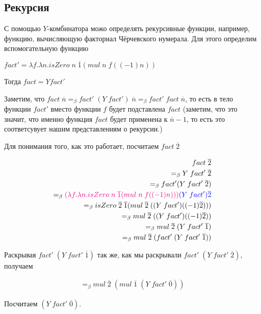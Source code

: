 \subsection{Рекурсия}

С помощью $Y$-комбинатора можо определять рекурсивные функции, например, функцию, вычисляющую факториал Чёрчевского нумерала. Для этого определим вспомогательную функцию

$fact' = \lambda f. \lambda n. isZero\; n \; \overline{1} (mul \; n \; f((-1) n))$

Тогда $fact = Y fact'$

Заметим, что $fact \; \overline{n} =_{\beta} fact' \; (Y \; fact') \; \overline{n} =_{\beta}fact' \; fact \; \overline{n} $, то есть в тело функции $fact'$ вместо функции $f$ будет подставлена $fact$ (заметим, что это значит, что именно функция $fact$ будет применена к $\overline{n} - 1$, то есть это соответсувует нашим представлениям о рекурсии.)

Для понимания того, как это работает, посчитаем $fact \; \overline{2}$

\begin{align*}
	fact \; \overline{2} \\ =_{\beta} Y \; fact' \; \overline{2}\\ =_{\beta} fact' (Y \; fact' \; \overline{2}) \\=_{\beta}\textcolor{magenta}{(\lambda f. \lambda n. isZero\; n \; \overline{1} (mul \; n \; f((-1) n)))} \textcolor{blue}{(Y \; fact') \overline{2}} \\
	=_{\beta}isZero\; \overline{2} \; \overline{1} (mul \; \overline{2} \; ((Y \; fact')((-1) \overline{2}))) \\ =_{\beta} mul \; \overline{2} \; ((Y \; fact')((-1) \overline{2})) \\ =_{\beta} mul \; \overline{2} \; (Y \; fact' \; \overline{1}) \\ =_{\beta} mul \; \overline{2} \; (fact' \;(Y \; fact' \; \overline{1}))
\end{align*}

Раскрывая $fact' \;(Y \; fact' \; \overline{1})$ так же, как мы раскрывали  $fact' \;(Y \; fact' \; \overline{2})$, получаем

\begin{align*}
	=_{\beta} mul \; \overline{2} \; (mul \; \overline{1} \; (Y \; fact' \; \overline{0}))
\end{align*}

Посчитаем $(Y \; fact' \; \overline{0})$.

